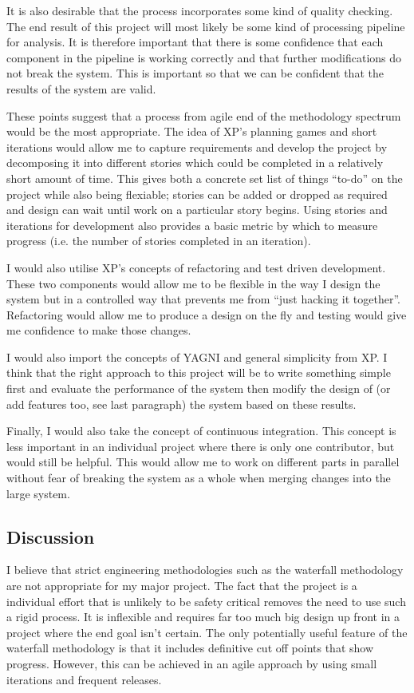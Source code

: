 \documentclass[paper=a4, fontsize=11pt]{scrartcl}	%
\numberwithin{equation}{section} %
\numberwithin{figure}{section} %
\numberwithin{table}{section}
\begin{document}
It is also desirable that the process incorporates some kind of quality checking. The end result of this project will most likely be some kind of processing pipeline for analysis. It is therefore important that there is some confidence that each component in the pipeline is working correctly and that further modifications do not break the system. This is important so that we can be confident that the results of the system are valid.

These points suggest that a process from agile end of the methodology spectrum would be the most appropriate. The idea of XP's planning games and short iterations would allow me to capture requirements and develop the project by decomposing it into different stories which could be completed in a relatively short amount of time. This gives both a concrete set list of things ``to-do'' on the project while also being flexiable; stories can be added or dropped as required and design can wait until work on a particular story begins. Using stories and iterations for development also provides a basic metric by which to measure progress (i.e. the number of stories completed in an iteration).

I would also utilise XP's concepts of refactoring and test driven development. These two components would allow me to be flexible in the way I design the system but in a controlled way that prevents me from ``just hacking it together''. Refactoring would allow me to produce a design on the fly and testing would give me confidence to make those changes.

I would also import the concepts of YAGNI and general simplicity from XP. I think that the right approach to this project will be to write something simple first and evaluate the performance of the system then modify the design of (or add features too, see last paragraph) the system based on these results.

Finally, I would also take the concept of continuous integration. This concept is less important in an individual project where there is only one contributor, but would still be helpful. This would allow me to work on different parts in parallel without fear of breaking the system as a whole when merging changes into the large system.

\subsection*{Discussion}
I believe that strict engineering methodologies such as the waterfall methodology are not appropriate for my major project. The fact that the project is a individual effort that is unlikely to be safety critical removes the need to use such a rigid process. It is inflexible and requires far too much big design up front in a project where the end goal isn't certain. The only potentially useful feature of the waterfall methodology is that it includes definitive cut off points that show progress. However, this can be achieved in an agile approach by using small iterations and frequent releases.
\end{document}
